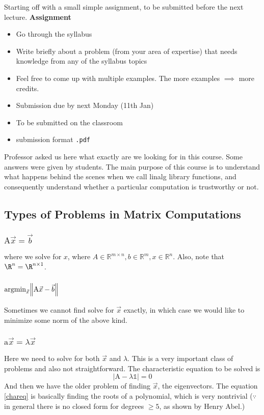\documentclass[a4paper]{article}
\begin{document}
Starting off with a small simple assignment, to be submitted before
the next lecture.
\textbf{Assignment}
\begin{itemize}
	\item Go through the syllabus
	\item Write briefly about a problem (from your area of expertise) that needs knowledge from any of the syllabus topics
	\item Feel free to come up with multiple examples. The more examples $\implies$ more credits.
	\item Submission due by next Monday (11th Jan)
	\item To be submitted on the classroom
	\item submission format \texttt{.pdf}
\end{itemize}

Professor asked us here what exactly are we looking for in this course.
Some answers were given by students. The main purpose of this course
is to understand what happens behind the scenes when we call linalg
library functions, and consequently understand whether a particular
computation is trustworthy or not.

\subsection{Types of Problems in Matrix Computations}
\subsubsection{$\mathrm{A}\vec{x} = \vec{b}$}
where we solve for $x$, where $A \in \mathbb{R}^{m\times n}
		,b \in  \mathbb{R}^{m}
		,x \in \mathbb{R} ^{n}$. Also, note that $\R^{n} = \R^{n\times 1}$.

\subsubsection{$\text{argmin}_{\vec{x}}\norm{\mathrm A \vec{x} - \vec{b}}$}
	Sometimes we cannot find solve for $\vec{x}$ exactly, in which
	case we would like to minimize some norm of the above kind.
\subsubsection{$\mathrm a \vec{x}= \lambda \vec{x}$}
Here we need to solve for both $\vec{x}$ and $\lambda$. This is a
very important class of problems and also not straightforward. The
characteristic equation to be solved is
\begin{equation}\label{chareq}
	\left| \mathrm A - \lambda \mathbb{1} \right|  = 0
\end{equation}
And then we have the older problem of finding $\vec{x}$, the eigenvectors.
The equation \ref{chareq} is basically finding the roots of a polynomial,
which is very nontrivial ($\because$ in general there is no closed
form for degrees $\ge 5$, as shown by Henry Abel.)
\end{document}
